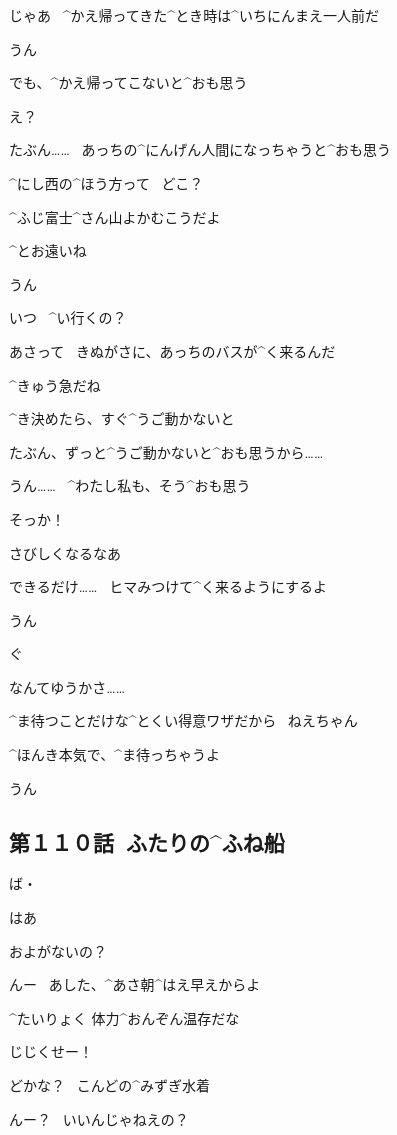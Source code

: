 \A じゃあ
\ ^{かえ}{帰}ってきた^{とき}{時}は^{いちにんまえ}{一人前}だ

\T うん

\page
\T でも、^{かえ}{帰}ってこないと^{おも}{思}う

\A え？

\T たぶん……
\ あっちの^{にんげん}{人間}になっちゃうと^{おも}{思}う

\page
\A ^{にし}{西}の^{ほう}{方}って
\ どこ？

\T ^{ふじ}{富士}^{さん}{山}よかむこうだよ

\A ^{とお}{遠}いね

\T うん

\page
\A いつ
\ ^{い}{行}くの？

\T あさって
\ きぬがさに、あっちのバスが^{く}{来}るんだ

\A ^{きゅう}{急}だね

\T ^{き}{決}めたら、すぐ^{うご}{動}かないと

\T たぶん、ずっと^{うご}{動}かないと^{おも}{思}うから……

\A うん……
\ ^{わたし}{私}も、そう^{おも}{思}う

\A そっか！

\page
\A さびしくなるなあ

\T できるだけ……
\ ヒマみつけて^{く}{来}るようにするよ

\A うん

\page
\T ぐ

\A なんてゆうかさ……

\A ^{ま}{待}つことだけな^{とくい}{得意}ワザだから
\ ねえちゃん

\A ^{ほんき}{本気}で、^{ま}{待}っちゃうよ

\page
\T うん


\subsection{第１１０話\ ふたりの^{ふね}{船}}

\page[153]
\M ば・

\M はあ

\M およがないの？

\T んー
\ あした、^{あさ}{朝}^{はえ}{早}えからよ

\T ^{たいりょく }{体力}^{おんぞん}{温存}だな

\M じじくせー！

\page
\M どかな？
\ こんどの^{みずぎ}{水着}

\T んー？
\ いいんじゃねえの？

